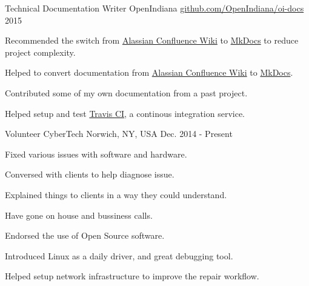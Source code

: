 


\begin{cventries}


\cventry
{Technical Documentation Writer} %
{OpenIndiana} %
{\href{https://github.com/OpenIndiana/oi-docs}{github.com/OpenIndiana/oi-docs}} %
{2015} %
{ %
\begin{cvitems}
\item{Recommended the switch from \href{https://www.atlassian.com/software/confluence}{Alassian Confluence Wiki} to \href{http://www.mkdocs.org/}{MkDocs} to reduce project complexity.}
\item {Helped to convert documentation from \href{https://www.atlassian.com/software/confluence}{Alassian Confluence Wiki} to \href{http://www.mkdocs.org/}{MkDocs}.}
\item {Contributed some of my own documentation from a past project.}
\item {Helped setup and test \href{https://travis-ci.org/}{Travis CI}, a continous integration service.}
\end{cvitems}
}


\cventry
{Volunteer} %
{CyberTech} %
{Norwich, NY, USA} %
{Dec. 2014 - Present} %
{ %
\begin{cvitems}
\item {Fixed various issues with software and hardware.}
\item {Conversed with clients to help diagnose issue.}
\item {Explained things to clients in a way they could understand.}
\item {Have gone on house and bussiness calls.}
\item {Endorsed the use of Open Source software.}
\item {Introduced Linux as a daily driver, and great debugging tool.}
\item {Helped setup network infrastructure to improve the repair workflow.}
\end{cvitems}
}


\end{cventries}
